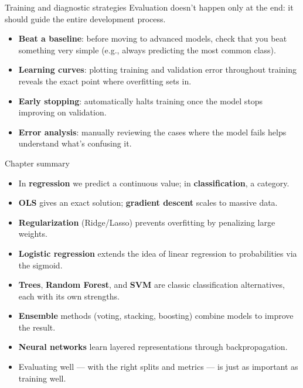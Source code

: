 \documentclass[aspectratio=169]{beamer}
\begin{document}
\begin{frame}{Training and diagnostic strategies}
  \small
  Evaluation doesn't happen only at the end: it should guide the entire development process.
  \begin{itemize}
    \item \textbf{Beat a baseline}: before moving to advanced models, check that you beat something very simple (e.g., always predicting the most common class).
    \item \textbf{Learning curves}: plotting training and validation error throughout training reveals the exact point where overfitting sets in.
    \item \textbf{Early stopping}: automatically halts training once the model stops improving on validation.
    \item \textbf{Error analysis}: manually reviewing the cases where the model fails helps understand what's confusing it.
  \end{itemize}
\end{frame}

\begin{frame}{Chapter summary}
  \small
  \begin{itemize}
    \item In \textbf{regression} we predict a continuous value; in \textbf{classification}, a category.
    \item \textbf{OLS} gives an exact solution; \textbf{gradient descent} scales to massive data.
    \item \textbf{Regularization} (Ridge/Lasso) prevents overfitting by penalizing large weights.
    \item \textbf{Logistic regression} extends the idea of linear regression to probabilities via the sigmoid.
    \item \textbf{Trees}, \textbf{Random Forest}, and \textbf{SVM} are classic classification alternatives, each with its own strengths.
    \item \textbf{Ensemble} methods (voting, stacking, boosting) combine models to improve the result.
    \item \textbf{Neural networks} learn layered representations through backpropagation.
    \item Evaluating well --- with the right splits and metrics --- is just as important as training well.
  \end{itemize}
\end{frame}
\end{document}
